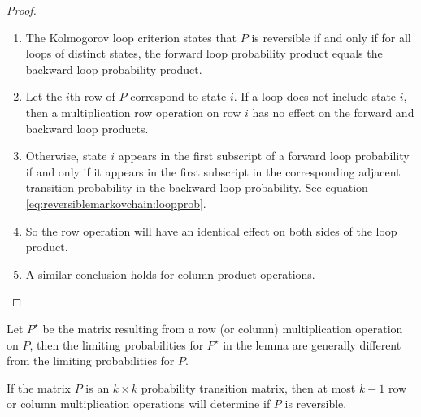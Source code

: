 \documentclass[12pt]{article}
\begin{document}
\begin{proof}
    \begin{enumerate}
        \item
            The Kolmogorov loop criterion states that \( P \) is
            reversible if and only if for all loops of distinct states,
            the forward loop probability product equals the backward
            loop probability product.
        \item
            Let the \( i \)th row of \( P \) correspond to state \( i \).
            If a loop does not include state \( i \), then a
            multiplication row operation on row \( i \) has no effect on
            the forward and backward loop products.
        \item
            Otherwise, state \( i \) appears in the first subscript of a
            forward loop probability if and only if it appears in the
            first subscript in the corresponding adjacent transition
            probability in the backward loop probability.  See equation
            \eqref{eq:reversiblemarkovchain:loopprob}.
        \item
            So the row operation will have an identical effect on both
            sides of the loop product.
        \item
            A similar conclusion holds for column product operations.
    \end{enumerate}
\end{proof}

\begin{remark}
    Let \( P^{\star} \) be the matrix resulting from a row (or column)
    multiplication operation on \( P \), then the limiting probabilities
    for \( P^{\star} \) in the lemma are generally different from the
    limiting probabilities for \( P \).
\end{remark}

If the matrix \( P \) is an \( k \times k \) probability transition
matrix, then at most \( k - 1 \) row or column multiplication operations
will determine if \( P \) is reversible.
\end{document}
